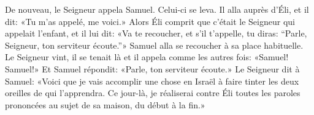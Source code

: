De nouveau, le Seigneur appela Samuel.
Celui-ci se leva. Il alla auprès d’Éli, et il dit:
	«Tu m’as appelé, me voici.»
Alors Éli comprit que c’était le Seigneur qui appelait l’enfant,
	et il lui dit: «Va te recoucher, et s’il t’appelle, tu diras:
	“Parle, Seigneur, ton serviteur écoute.”»
Samuel alla se recoucher à sa place habituelle.
Le Seigneur vint, il se tenait là et il appela comme les autres fois:
	«Samuel! Samuel!»
	Et Samuel répondit: «Parle, ton serviteur écoute.»
Le Seigneur dit à Samuel:
	«Voici que je vais accomplir une chose en Israël
	à faire tinter les deux oreilles de qui l’apprendra.
Ce jour-là, je réaliserai contre Éli toutes les paroles prononcées au sujet de sa maison,
	du début à la fin.»
